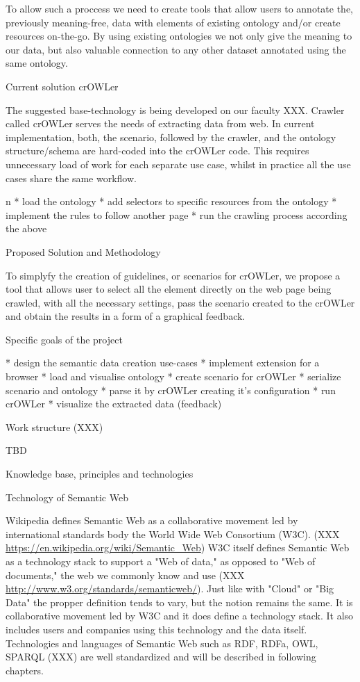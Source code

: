 To allow such a proccess we need to create tools that allow users to annotate
the, previously meaning-free, data with elements of existing ontology and/or
create resources on-the-go. By using existing ontologies we not only give the
meaning to our data, but also valuable connection to any other dataset
annotated using the same ontology. 


\sec Current solution crOWLer

The suggested base-technology is being developed on our faculty XXX. Crawler
called crOWLer serves the needs of extracting data from web. In current
implementation, both, the scenario, followed by the crawler, and the ontology
structure/schema are hard-coded into the crOWLer code. This requires
unnecessary load of work for each separate use case, whilst in practice all the
use cases share the same workflow. 

\begitems \style n
  * load the ontology
  * add selectors to specific resources from the ontology
  * implement the rules to follow another page
  * run the crawling process according the above
\enditems



\sec Proposed Solution and Methodology

To simplyfy the creation of guidelines, or scenarios for crOWLer, we propose a
tool that allows user to select all the element directly on the web page being
crawled, with all the necessary settings, pass the scenario created to the
crOWLer and obtain the results in a form of a graphical feedback. 

\sec Specific goals of the project

\begitems
  * design the semantic data creation use-cases
  * implement extension for a browser
  * load and visualise ontology
  * create scenario for crOWLer 
  * serialize scenario and ontology
  * parse it by crOWLer creating it's configuration
  * run crOWLer
  * visualize the extracted data (feedback)
\enditems


\sec Work structure (XXX)

TBD











\chap Knowledge base, principles and technologies

\sec Technology of Semantic Web

Wikipedia defines Semantic Web as a collaborative movement led by international
standards body the World Wide Web Consortium (W3C).  (XXX
\url{https://en.wikipedia.org/wiki/Semantic_Web}) W3C itself defines Semantic
Web as a technology stack to support a "Web of data," as opposed to "Web of
documents," the web we commonly know and use (XXX
\url{http://www.w3.org/standards/semanticweb/}). Just like with "Cloud" or "Big
Data" the propper definition tends to vary, but the notion remains the same.
It is collaborative movement led by W3C and it does define a technology stack.
It also includes users and companies using this technology and the data itself. 
Technologies and languages of Semantic Web such as RDF, RDFa, OWL, SPARQL (XXX)
are well standardized and will be described in following chapters. 

